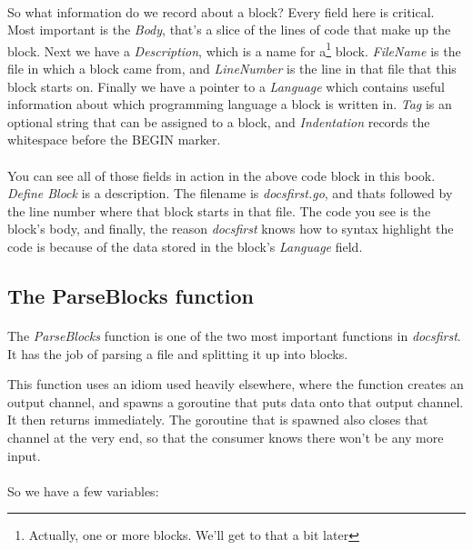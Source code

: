 \documentclass{article}
\begin{document}
\paragraph{}
So what information do we record about a block? Every field here is critical.
Most important is the \emph{Body}, that's a slice of the lines of code that make
up the block. Next we have a \emph{Description}, which is a name for
a\footnote{Actually, one or more blocks. We'll get to that a bit later} block.
\emph{FileName} is the file in which a block came from, and \emph{LineNumber}
is the line in that file that this block starts on. Finally we have a pointer to
a \emph{Language} which contains useful information about which programming
language a block is written in. \emph{Tag} is an optional string that can be
assigned to a block, and \emph{Indentation} records the whitespace before the
BEGIN marker.

\paragraph{}
You can see all of those fields in action in the above code block in this book.
\emph{Define Block} is a description. The filename is \emph{docsfirst.go}, and
thats followed by the line number where that block starts in that file. The code
you see is the block's body, and finally, the reason \emph{docsfirst} knows how
to syntax highlight the code is because of the data stored in the block's
\emph{Language} field.

\subsection{The ParseBlocks function}

\paragraph{}
The \emph{ParseBlocks} function is one of the two most important functions in
\emph{docsfirst}. It has the job of parsing a file and splitting it up into
blocks.


This function uses an idiom used heavily elsewhere, where the function creates an
output channel, and spawns a goroutine that puts data onto that output channel.
It then returns immediately. The goroutine that is spawned also closes that
channel at the very end, so that the consumer knows there won't be any more
input.

\paragraph{}
So we have a few variables:
\end{document}

